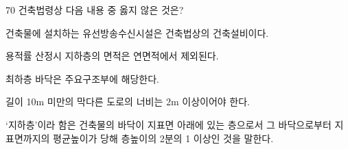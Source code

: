 \begin{question}{70}
건축법령상 다음 내용 중 옳지 않은 것은?
\begin{choices}
  \item 건축물에 설치하는 유선방송수신시설은 건축법상의 건축설비이다.
  \item 용적률 산정시 지하층의 면적은 연면적에서 제외된다.
  \item 최하층 바닥은 주요구조부에 해당한다.
  \item 길이 10m 미만의 막다른 도로의 너비는 2m 이상이어야 한다.
  \item ‘지하층’이라 함은 건축물의 바닥이 지표면 아래에 있는 층으로서 그 바닥으로부터 지표면까지의 평균높이가 당해 층높이의 2분의 1 이상인 것을 말한다.
\end{choices}
\end{question}
